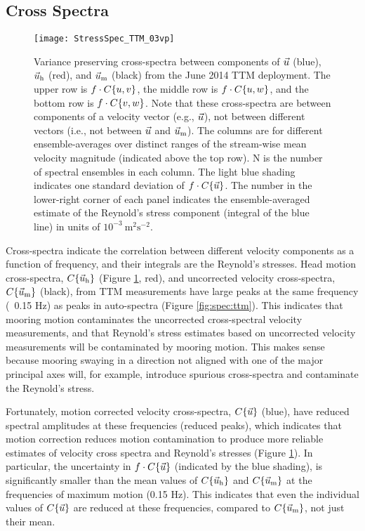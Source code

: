 \subsection{Cross Spectra}

\begin{figure*}[t]
  \centering
  \texttt{[image: StressSpec\_TTM\_03vp]}
  \caption{Variance preserving cross-spectra between components of $\vec{u}$ (blue), $\vec{u}_\mathrm{h}$ (red), and $\vec{u}_\mathrm{m}$ (black) from the June 2014 TTM deployment. The upper row is $f \cdot C\{u,v\}$, the middle row is $f \cdot C\{u,w\}$, and the bottom row is $f \cdot C\{v,w\}$.  Note that these cross-spectra are between components of a velocity vector (e.g., $\vec{u}$), not between different vectors (i.e., not between $\vec{u}$ and $\vec{u}_\mathrm{m}$). The columns are for different ensemble-averages over distinct ranges of the stream-wise mean velocity magnitude (indicated above the top row). N is the number of spectral ensembles in each column. The light blue shading indicates one standard deviation of $f \cdot C\{\vec{u}\}$. The number in the lower-right corner of each panel indicates the ensemble-averaged estimate of the Reynold's stress component (integral of the blue line) in units of  $\mathrm{10^{-3}\ m^2s^{-2}}$.}
  \label{fig:cspec:ttm}
\end{figure*}

Cross-spectra indicate the correlation between different velocity components as a function of frequency, and their integrals are the Reynold's stresses. Head motion cross-spectra, $C\{\vec{u}_\mathrm{h}\}$ (Figure \ref{fig:cspec:ttm}, red), and uncorrected velocity cross-spectra, $C\{\vec{u}_\mathrm{m}\}$ (black), from TTM measurements have large peaks at the same frequency (~0.15 Hz) as peaks in auto-spectra (Figure \ref{fig:spec:ttm}).  This indicates that mooring motion contaminates the uncorrected cross-spectral velocity measurements, and that Reynold's stress estimates based on uncorrected velocity measurements will be contaminated by mooring motion. This makes sense because mooring swaying in a direction not aligned with one of the major principal axes will, for example, introduce spurious cross-spectra and contaminate the Reynold's stress.

Fortunately, motion corrected velocity cross-spectra, $C\{\vec{u}\}$ (blue), have reduced spectral amplitudes at these frequencies (reduced peaks), which indicates that motion correction reduces motion contamination to produce more reliable estimates of velocity cross spectra and Reynold's stresses (Figure \ref{fig:cspec:ttm}). In particular, the uncertainty in $f\cdot C\{\vec{u}\}$ (indicated by the blue shading), is significantly smaller than the mean values of $C\{\vec{u}_\mathrm{h}\}$ and $C\{\vec{u}_\mathrm{m}\}$ at the frequencies of maximum motion (0.15 Hz). This indicates that even the individual values of $C\{\vec{u}\}$ are reduced at these frequencies, compared to $C\{\vec{u}_\mathrm{m}\}$, not just their mean. 

